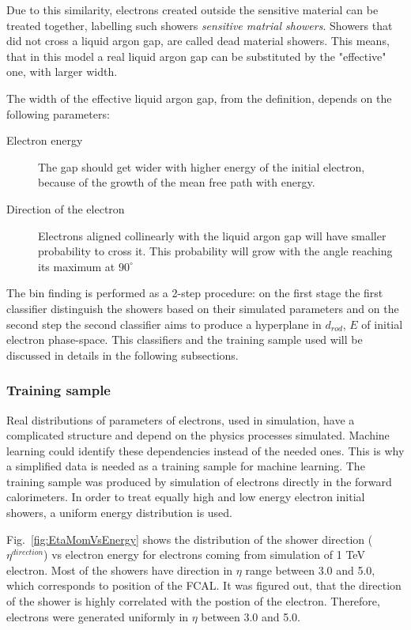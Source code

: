 Due to this similarity, electrons created outside the sensitive material can be treated together, labelling such showers \textit{sensitive matrial showers}. Showers that did not cross a liquid argon gap, are called dead material showers. This means, that in this model a real liquid argon gap can be substituted by the "effective" one, with larger width.

The width of the effective liquid argon gap, from the definition, depends on the following parameters:
\begin{description}

\item [Electron energy] The gap should get wider with higher energy of the initial electron, because of the growth of the mean free path with energy.
\item [Direction of the electron] Electrons aligned collinearly with the liquid argon gap will have smaller probability to cross it. This probability will grow with the angle reaching its maximum at  $90^{\circ}$

\end{description}

The bin finding is performed as a 2-step procedure:  on the first stage the first classifier distinguish the showers based on their simulated parameters and on the second step the second classifier aims to produce a hyperplane in $d_{rod}$, $E$ of initial electron phase-space. This classifiers and the training sample used will be discussed in details in the following subsections.

\subsubsection{Training sample}

Real distributions of parameters of electrons, used in simulation, have a complicated structure and depend on the physics processes simulated. Machine learning could identify these dependencies instead of the needed ones. This is why a simplified data is needed as a training sample for machine learning. The training sample was produced by simulation of electrons directly in the forward calorimeters. In order to treat equally high and low energy electron initial showers, a uniform energy distribution is used.

Fig.~\ref{fig:EtaMomVsEnergy} shows the distribution of the shower direction ($\eta^{direction}$) vs electron energy for electrons coming from simulation of 1 TeV electron. Most of the showers have direction in $\eta$ range between 3.0 and 5.0, which corresponds to position of the FCAL. It was figured out, that the direction of the shower is highly correlated with the postion of the electron. Therefore, electrons were generated uniformly in $\eta$ between 3.0 and 5.0.


